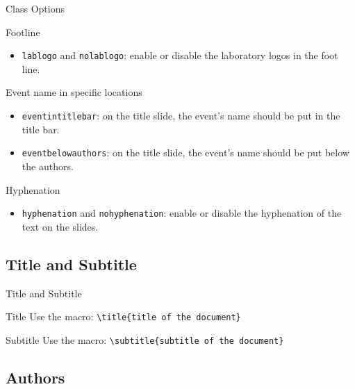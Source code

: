 \documentclass[english,sectioncirclenumberstyle]{le2iutbmbeamer}
\begin{document}
\begin{frame}[t]{Class Options \insertcontinuationtext}
	\begin{block}{Footline}
		\begin{itemize}
		\item \texttt{lablogo} and \texttt{nolablogo}: enable or disable the laboratory logos in the foot line.
		\end{itemize}
	\end{block}
	\begin{block}{Event name in specific locations}
		\begin{itemize}
		\item \texttt{eventintitlebar}: on the title slide, the event's name should be put in the title bar.
		\item \texttt{eventbelowauthors}: on the title slide, the event's name should be put below the authors.
		\end{itemize}
	\end{block}
	\begin{block}{Hyphenation}
		\begin{itemize}
		\item \texttt{hyphenation} and \texttt{nohyphenation}: enable or disable the hyphenation of the text on the slides.
		\end{itemize}
	\end{block}
	\smaller{}
\end{frame}

\subsection{Title and Subtitle}

\begin{frame}{Title and Subtitle}
	\begin{block}{Title}
		Use the macro: \texttt{{\textbackslash}title\{title of the document\}}
	\end{block}
	\vfill
	\begin{block}{Subtitle}
		Use the macro: \texttt{{\textbackslash}subtitle\{subtitle of the document\}}
	\end{block}
	\vfill
\end{frame}

\subsection{Authors}
\end{document}
